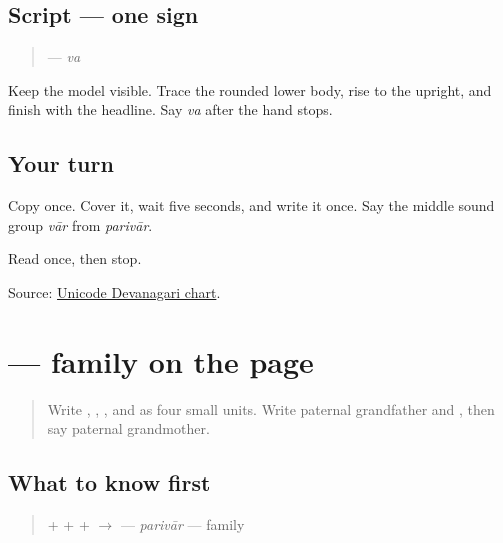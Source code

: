\subsection*{Script — one sign}

\begin{quote}
\textbf{} — \emph{va}
\end{quote}

Keep the model visible. Trace the rounded lower body, rise to the upright, and finish with the headline. Say \emph{va} after the hand stops.

\subsection*{Your turn}
Copy \textbf{} once. Cover it, wait five seconds, and write it once. Say the middle sound group \emph{vār} from \emph{parivār}.

\begin{tcolorbox}[breakable,colback=teal!4,colframe=teal!35!black,title={Before you move on}]
Read \textbf{} once, then stop.

Source: \href{https://www.unicode.org/charts/PDF/U0900.pdf}{Unicode Devanagari chart}.
\end{tcolorbox}
\section[\texorpdfstring{\mw{परिवार} (parivār)}{परिवार (parivār)}]{ — family on the page}

\label{lesson:MW-C08-parivaar}



\begin{quote}
Write \textbf{}, \textbf{}, \textbf{}, and \textbf{} as four small units. Write paternal grandfather and \textbf{}, then say paternal grandmother.
\end{quote}

\subsection*{What to know first}
\begin{quote}
\textbf{} + \textbf{} + \textbf{} + \textbf{} $\to$ \textbf{} — \emph{parivār} — family
\end{quote}

